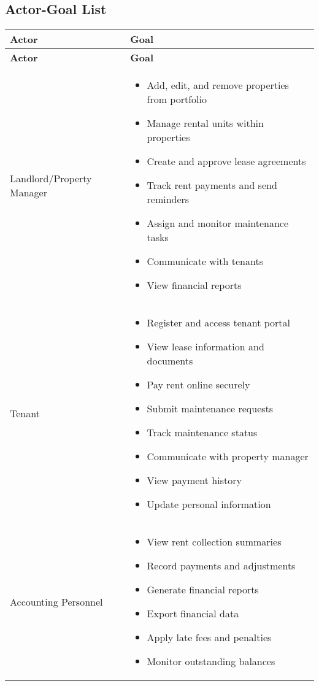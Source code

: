 \documentclass[12pt]{article}
\begin{document}
\subsection{Actor-Goal List}

\begin{longtable}{|p{4cm}|p{10cm}|}
\hline
\textbf{Actor} & \textbf{Goal} \\
\hline
\endfirsthead
\hline
\textbf{Actor} & \textbf{Goal} \\
\hline
\endhead

Landlord/Property Manager & 
\begin{itemize}
    \item Add, edit, and remove properties from portfolio
    \item Manage rental units within properties
    \item Create and approve lease agreements
    \item Track rent payments and send reminders
    \item Assign and monitor maintenance tasks
    \item Communicate with tenants
    \item View financial reports
\end{itemize} \\
\hline

Tenant & 
\begin{itemize}
    \item Register and access tenant portal
    \item View lease information and documents
    \item Pay rent online securely
    \item Submit maintenance requests
    \item Track maintenance status
    \item Communicate with property manager
    \item View payment history
    \item Update personal information
\end{itemize} \\
\hline

Accounting Personnel & 
\begin{itemize}
    \item View rent collection summaries
    \item Record payments and adjustments
    \item Generate financial reports
    \item Export financial data
    \item Apply late fees and penalties
    \item Monitor outstanding balances
\end{itemize} \\
\hline


\end{longtable}
\end{document}
